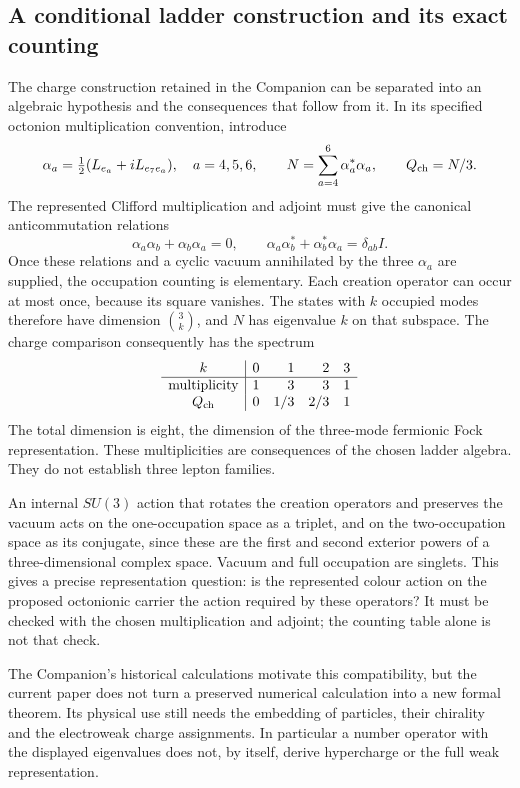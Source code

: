 \documentclass[11pt,a4paper]{article}
\begin{document}
\subsection{A conditional ladder construction and its exact counting}
The charge construction retained in the Companion can be separated
into an algebraic hypothesis and the consequences that follow from it.
In its specified octonion multiplication convention, introduce
\begin{equation}
 \alpha_a=\tfrac12(L_{e_a}+iL_{e_7e_a}),\quad a=4,5,6,
 \qquad N=\sum_{a=4}^6\alpha_a^*\alpha_a,
 \qquad Q_{\rm ch}=N/3.
\end{equation}
The represented Clifford multiplication and adjoint must give the
canonical anticommutation relations
\begin{equation}
 \alpha_a\alpha_b+\alpha_b\alpha_a=0,\qquad
 \alpha_a\alpha_b^*+\alpha_b^*\alpha_a=\delta_{ab}I.
\end{equation}
Once these relations and a cyclic vacuum annihilated by the three
$\alpha_a$ are supplied, the occupation counting is elementary.
Each creation operator can occur at most once, because its square
vanishes. The states with $k$ occupied modes therefore have dimension
$\binom3k$, and $N$ has eigenvalue $k$ on that subspace. The charge
comparison consequently has the spectrum
\begin{equation}
 \begin{array}{c|rrrr}
 k&0&1&2&3\\\hline
 \text{multiplicity}&1&3&3&1\\
 Q_{\rm ch}&0&1/3&2/3&1
 \end{array}
\end{equation}
The total dimension is eight, the dimension of the three-mode fermionic
Fock representation. These multiplicities are consequences of the
chosen ladder algebra. They do not establish three lepton families.

An internal $SU(3)$ action that rotates the creation operators and
preserves the vacuum acts on the one-occupation space as a triplet,
and on the two-occupation space as its conjugate, since these are
the first and second exterior powers of a three-dimensional complex
space. Vacuum and full occupation are singlets. This gives a precise
representation question: is the represented colour action on the
proposed octonionic carrier the action required by these operators?
It must be checked with the chosen multiplication and adjoint; the
counting table alone is not that check.

The Companion's historical calculations motivate this compatibility,
but the current paper does not turn a preserved numerical calculation
into a new formal theorem. Its physical use still needs the embedding
of particles, their chirality and the electroweak charge assignments.
In particular a number operator with the displayed eigenvalues does
not, by itself, derive hypercharge or the full weak representation.
\end{document}
